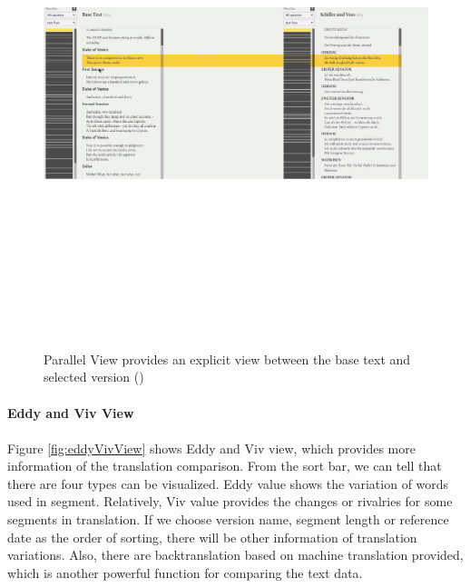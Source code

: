 \begin{figure}[h] 
	\centering	
	\includegraphics[width=16cm, height=14cm]{Figs/Parallel-View}\\[1ex]
	\caption{Parallel View provides an explicit view between the base text and selected version (\cite{Cheesman2012})}
	\label{fig:parallelView}
\end{figure} 

\paragraph{Eddy and Viv View}
\paragraph[]{}

Figure \ref{fig:eddyVivView} shows Eddy and Viv view, which provides more information of the translation comparison. From the sort bar, we can tell that there are four types can be visualized. Eddy value shows the variation of words used in segment. Relatively, Viv value provides the changes or rivalries for some segments in translation. If we choose version name, segment length or reference date as the order of sorting, there will be other information of translation variations. Also, there are backtranslation based on machine translation provided, which is another powerful function for comparing the text data.

